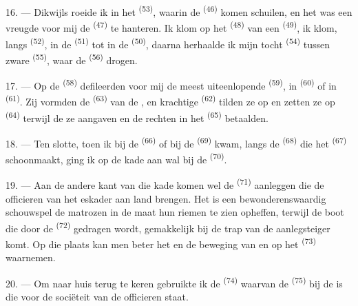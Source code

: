 \VUsaut{3.0mm}
\VUsaut{3.0mm}

16. --- Dikwijls roeide ik in het  \textsuperscript{(53)}, waarin de
 \textsuperscript{(46)} komen schuilen, en het was een vreugde voor mij de
 \textsuperscript{(47)} te hanteren. Ik klom op het 
\textsuperscript{(48)} van een  \textsuperscript{(49)}, ik klom, langs
 \textsuperscript{(52)}, in de  \textsuperscript{(51)} tot in de
 \textsuperscript{(50)}, daarna herhaalde ik mijn tocht 
\textsuperscript{(54)} tussen zware  \textsuperscript{(55)}, waar de
 \textsuperscript{(56)} drogen.

17. --- Op de  \textsuperscript{(58)} defileerden voor mij de meest uiteenlopende
 \textsuperscript{(59)}, in  \textsuperscript{(60)} of in
 \textsuperscript{(61)}. Zij vormden de  \textsuperscript{(63)}
van de , en krachtige
 \textsuperscript{(62)} tilden ze op en zetten ze op
 \textsuperscript{(64)} terwijl de  ze
aangaven en de rechten in het  \textsuperscript{(65)} betaalden.

18. --- Ten slotte, toen ik bij de  \textsuperscript{(66)} of bij de
 \textsuperscript{(69)} kwam, langs de
 \textsuperscript{(68)} die het 
\textsuperscript{(67)} schoonmaakt, ging ik op de kade aan wal bij de
 \textsuperscript{(70)}.

19. --- Aan de andere kant van die kade komen wel de  \textsuperscript{(71)}
aanleggen die de officieren van het eskader aan land brengen. Het is een bewonderenswaardig
schouwspel de matrozen in de maat hun riemen te zien opheffen, terwijl de boot die door de
 \textsuperscript{(72)} gedragen wordt, gemakkelijk bij de trap van de
aanlegsteiger komt. Op die plaats kan men beter het  en de beweging van
 en  op het  \textsuperscript{(73)} waarnemen.

\VUsaut{3.0mm}
\VUsaut{3.0mm}

20. --- Om naar huis terug te keren gebruikte ik de 
\textsuperscript{(74)} waarvan de  \textsuperscript{(75)} bij de
 is die voor de sociëteit van de officieren staat.

